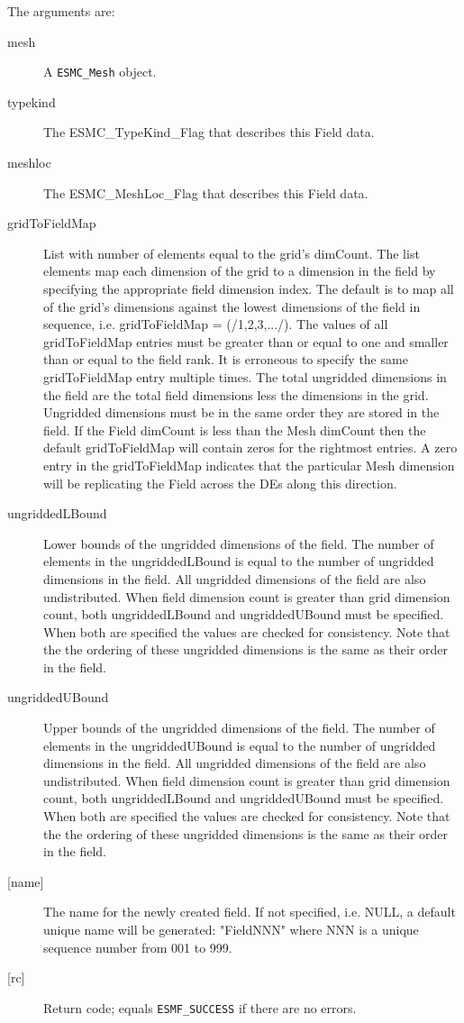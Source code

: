     The arguments are:
    \begin{description}
    \item[mesh]
      A {\tt ESMC\_Mesh} object.
    \item[typekind]
      The ESMC\_TypeKind\_Flag that describes this Field data.
    \item[meshloc]
      The ESMC\_MeshLoc\_Flag that describes this Field data.
    \item[gridToFieldMap]
      List with number of elements equal to the grid's dimCount. The list
      elements map each dimension of the grid to a dimension in the field by
      specifying the appropriate field dimension index. The default is to map all of
      the grid's dimensions against the lowest dimensions of the field in sequence,
      i.e. gridToFieldMap = (/1,2,3,.../). The values of all gridToFieldMap entries
      must be greater than or equal to one and smaller than or equal to the field
      rank. It is erroneous to specify the same gridToFieldMap entry multiple times.
      The total ungridded dimensions in the field  are the total field dimensions
      less the dimensions in the grid. Ungridded dimensions must be in the same order
      they are stored in the field. If the Field dimCount is less than the Mesh
      dimCount then the default gridToFieldMap will contain zeros for the rightmost
      entries. A zero entry in the gridToFieldMap indicates that the particular Mesh
      dimension will be replicating the Field across the DEs along this direction.
    \item[ungriddedLBound]
      Lower bounds of the ungridded dimensions of the field. The number of elements
      in the ungriddedLBound is equal to the number of ungridded dimensions in the
      field. All ungridded dimensions of the field are also undistributed. When field
      dimension count is greater than grid dimension count, both ungriddedLBound and
      ungriddedUBound must be specified. When both are specified the values are
      checked for consistency. Note that the the ordering of these ungridded
      dimensions is the same as their order in the field.  
    \item[ungriddedUBound]
      Upper bounds of the ungridded dimensions of the field. The number of elements
      in the ungriddedUBound is equal to the number of ungridded dimensions in the
      field. All ungridded dimensions of the field are also undistributed. When field
      dimension count is greater than grid dimension count, both ungriddedLBound and
      ungriddedUBound must be specified. When both are specified the values are
      checked for consistency. Note that the the ordering of these ungridded
      dimensions is the same as their order in the field.  
    \item[{[name]}]
      The name for the newly created field.  If not specified, i.e. NULL,
      a default unique name will be generated: "FieldNNN" where NNN
      is a unique sequence number from 001 to 999.
    \item[{[rc]}]
      Return code; equals {\tt ESMF\_SUCCESS} if there are no errors.
    \end{description}
   
